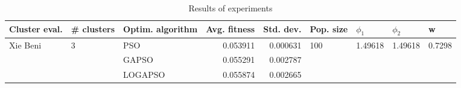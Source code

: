 \begin{table}
\centering
\caption{Results of experiments}
\begin{tabular}{lllrrllll}
\toprule
            Cluster eval. &        \# clusters & Optim. algorithm &  Avg. fitness &  Std. dev. &            Pop. size &               $\phi_{1}$ &               $\phi_{2}$ &                       w \\
\midrule
\multirow{3}{*}{Xie Beni} & \multirow{3}{*}{3} &              PSO &      0.053911 &   0.000631 & \multirow{3}{*}{100} & \multirow{3}{*}{1.49618} & \multirow{3}{*}{1.49618} & \multirow{3}{*}{0.7298} \\
                          &                    &            GAPSO &      0.055291 &   0.002787 &                      &                          &                          &                         \\
                          &                    &          LOGAPSO &      0.055874 &   0.002665 &                      &                          &                          &                         \\
\bottomrule
\end{tabular}
\end{table}
